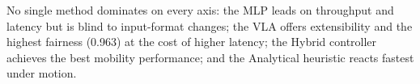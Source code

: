 \documentclass[journal]{IEEEtran}
\begin{document}
No single method dominates on every axis: the MLP leads on throughput and latency but is blind to input-format changes; the VLA offers extensibility and the highest fairness (0.963) at the cost of higher latency; the Hybrid controller achieves the best mobility performance; and the Analytical heuristic reacts fastest under motion.


%
%
%
%
\end{document}
